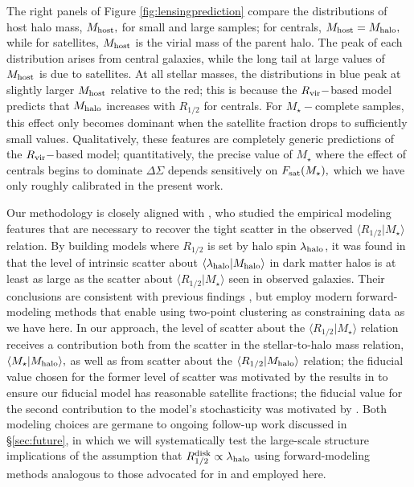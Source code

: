 \documentclass[usenatbib,usegraphicx,letterpaper]{mn2e}
\newcommand{\rhalf}{R_{1/2}}
\newcommand{\mstar}{M_{\star}}
\newcommand{\mhalo}{M_{\rm halo}}
\newcommand{\mhost}{M_{\rm host}}
\newcommand{\rvir}{R_{\rm vir}}
\newcommand{\mean}[2]{\langle{#1}\vert{#2}\rangle}
\begin{document}
The right panels of Figure \ref{fig:lensingprediction} compare the distributions of host halo mass, $\mhost,$ for small and large samples; for centrals, $\mhost=\mhalo,$ while for satellites, $\mhost$ is the virial mass of the parent halo. The peak of each distribution arises from central galaxies, while the long tail at large values of $\mhost$ is due to satellites. At all stellar masses, the distributions in blue peak at slightly larger $\mhost$ relative to the red; this is because the $\rvir-$based model predicts that $\mhalo$ increases with $\rhalf$ for centrals. For $\mstar-$complete samples, this effect only becomes dominant when the satellite fraction drops to sufficiently small values. Qualitatively, these features are completely generic predictions of the $\rvir-$based model; quantitatively, the precise value of $\mstar$ where the effect of centrals begins to dominate $\Delta\Sigma$ depends sensitively on $F_{\rm sat}(\mstar),$ which we have only roughly calibrated in the present work.

Our methodology is closely aligned with \citet{somerville_etal17}, who studied the empirical modeling features that are necessary to recover the tight scatter in the observed $\mean{\rhalf}{\mstar}$ relation. By building models where $\rhalf$ is set by halo spin $\lambda_{\rm halo}$, it was found in \citet{somerville_etal17} that the level of intrinsic scatter about $\langle\lambda_{\rm halo}\vert\mhalo\rangle$ in dark matter halos is at least as large as the scatter about $\langle\rhalf\vert\mstar\rangle$ seen in observed galaxies. Their conclusions are consistent with previous findings \citep[e.g.,][]{dejong_lacey00, gnedin_etal07}, but employ modern forward-modeling methods that enable using two-point clustering as constraining data as we have here. In our approach, the level of scatter about the $\langle\rhalf\vert\mstar\rangle$ relation receives a contribution both from the scatter in the stellar-to-halo mass relation, $\langle\mstar\vert\mhalo\rangle,$ as well as from scatter about the $\langle\rhalf\vert\mhalo\rangle$ relation; the fiducial value chosen for the former level of scatter was motivated by the results in \citet{reddick_etal13} to ensure our fiducial model has reasonable satellite fractions; the fiducial value for the second contribution to the model's stochasticity was motivated by \citet{somerville_etal17}. Both modeling choices are germane to ongoing follow-up work discussed in \S\ref{sec:future}, in which we will systematically test the large-scale structure implications of the assumption that $\rhalf^{\rm disk}\propto\lambda_{\rm halo}$ using forward-modeling methods analogous to those advocated for in \citet{somerville_etal17} and employed here.
\end{document}

